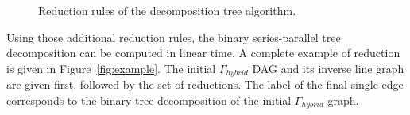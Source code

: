 \begin{figure}[h!]
\begin{center}
{
}
\caption{Reduction rules of the decomposition tree algorithm.}
\label{fig:newrules}
\end{center}
\end{figure}

Using those additional reduction rules, the binary series-parallel tree decomposition can be computed in linear time. A complete example of reduction is given in Figure~\ref{fig:example}. The initial $\Gamma_{hybrid}$ DAG and its inverse line graph are given first, followed by the set of reductions. The label of the final single edge corresponds to the binary tree decomposition of the initial $\Gamma_{hybrid}$ graph. 

